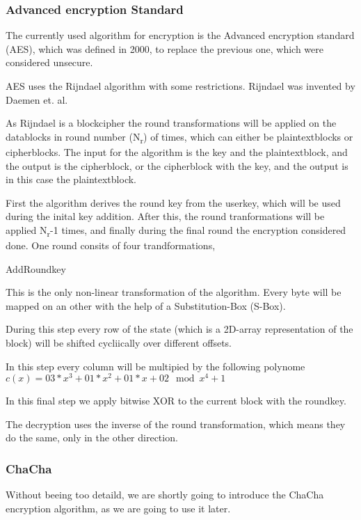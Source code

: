 \documentclass[12pt,a4paper,titlepage,oneside]{scrartcl}
\begin{document}
\subsubsection{Advanced encryption Standard}
The currently used algorithm for encryption is the Advanced encryption standard (AES), which was defined in 2000, to replace the previous one, which were considered unsecure.

AES uses the Rijndael algorithm with some restrictions.
Rijndael was invented by Daemen et. al. \cite{daemen2013design}

As Rijndael is a blockcipher the round transformations will be applied on the datablocks in round number (N\textsubscript{r}) of times, which can either be plaintextblocks or cipherblocks.
The input for the algorithm is the key and the plaintextblock, and the output is the cipherblock, or the cipherblock with the key, and the output is in this case the plaintextblock. \cite{daemen2013design}

First the algorithm derives the round key from the userkey, which will be used during the inital key addition.
After this, the round tranformations will be applied N\textsubscript{r}-1 times, and finally during the final round the encryption considered done.
One round consits of four trandformations,
\begin{labeling}{AddRoundkey}
\item [SubBytes] This is the only non-linear transformation of the algorithm. Every byte will be mapped on an other with the help of a Substitution-Box (S-Box).
\item [ShiftRows] During this step every row of the state (which is a 2D-array representation of the block) will be shifted cycliically over different offsets.
\item [MixColumns] In this step every column will be multipied by the following polynome \begin{math} c(x) = 03 * x^3 + 01 * x^2 + 01 * x + 02 \mod x^4 + 1 \end{math}
\item [AddRoundkey] In this final step we apply bitwise XOR to the current block with the roundkey.
\end{labeling}
The decryption uses the inverse of the round transformation, which means they do the same, only in the other direction. \cite{daemen2013design}

\subsubsection{ChaCha}
Without beeing too detaild, we are shortly going to introduce the ChaCha encryption algorithm, as we are going to use it later.
\end{document}
